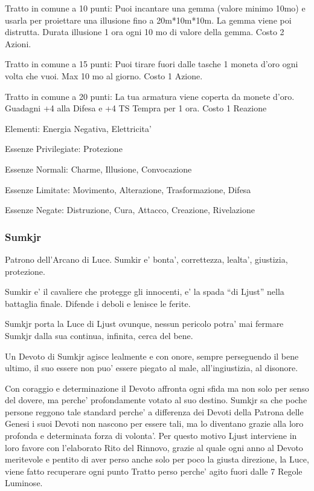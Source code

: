 \documentclass[a4paper,11pt,twoside,openany]{dndbook}
\begin{document}
{Tratto in comune a 10 punti: Puoi incantare una gemma (valore minimo 10mo) e usarla per proiettare una illusione fino a 20m{*}10m{*}10m. La gemma viene poi distrutta. Durata illusione 1 ora ogni 10 mo di valore della gemma. Costo 2 Azioni.

Tratto in comune a 15 punti: Puoi tirare fuori dalle tasche 1 moneta d'oro ogni volta che vuoi. Max 10 mo al giorno. Costo 1 Azione.

Tratto in comune a 20 punti: La tua armatura viene coperta da monete d'oro. Guadagni +4 alla Difesa e +4 TS Tempra per 1 ora. Costo 1 Reazione 

\bigskip

Elementi: Energia Negativa, Elettricita'

\bigskip

Essenze Privilegiate: Protezione

Essenze Normali: Charme, Illusione, Convocazione

Essenze Limitate: Movimento, Alterazione, Trasformazione, Difesa

Essenze Negate: Distruzione, Cura, Attacco, Creazione, Rivelazione

\subsubsection{Sumkjr}

\label{sumkjr}

Patrono dell'Arcano di Luce. Sumkir e' bonta', correttezza, lealta', giustizia, protezione.

Sumkir e' il cavaliere che protegge gli innocenti, e' la spada ``di Ljust'' nella battaglia finale. Difende i deboli e lenisce le ferite.

Sumkjr porta la Luce di Ljust ovunque, nessun pericolo potra' mai fermare Sumkjr dalla sua continua, infinita, cerca del bene.

Un Devoto di Sumkjr agisce lealmente e con onore, sempre perseguendo il bene ultimo, il suo essere non puo' essere piegato al male, all'ingiustizia, al disonore.

Con coraggio e determinazione il Devoto affronta ogni sfida ma non solo per senso del dovere, ma perche' profondamente votato al suo destino. Sumkjr sa che poche persone reggono tale standard perche' a differenza dei Devoti della Patrona delle Genesi i suoi Devoti non nascono per essere tali, ma lo diventano grazie alla loro profonda e determinata forza di volonta'. Per questo motivo Ljust interviene in loro favore con l'elaborato Rito del Rinnovo, grazie al quale ogni anno al Devoto meritevole e pentito di aver perso anche solo per poco la giusta direzione, la Luce, viene fatto recuperare ogni punto Tratto perso perche' agito fuori dalle 7 Regole Luminose.

}
\end{document}
